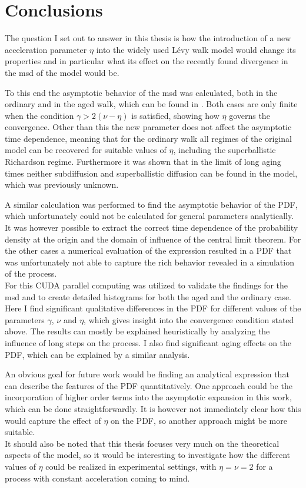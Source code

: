 \chapter{Conclusions}

The question I set out to answer in this thesis is how the introduction of a new acceleration parameter $\eta$ into the widely used L\'evy walk model would change its properties and in particular what its effect on the recently found divergence in the \gls{msd} of the model would be. 

To this end the asymptotic behavior of the \gls{msd} was calculated, both in the ordinary and in the aged walk, which can be found in \cite{bothe}. Both cases are only finite when the condition $\gamma > 2(\nu-\eta)$ is satisfied, showing how $\eta$ governs the convergence. Other than this the new parameter does not affect the asymptotic time dependence, meaning that for the ordinary walk all regimes of the original model can be recovered for suitable values of $\eta$, including the superballistic Richardson regime. 
{\color{blue}
Furthermore it was shown that in the limit of long aging times neither subdiffusion and superballistic diffusion can be found in the model, which was previously unknown.
}

A similar calculation was performed to find the asymptotic behavior of the \gls{PDF}, which unfortunately could not be calculated for general parameters analytically. It was however possible to extract the correct time dependence of the probability density at the origin and the domain of influence of the central limit theorem. For the other cases a numerical evaluation of the expression resulted in a \gls{PDF} that was unfortunately not able to capture the rich behavior revealed in a simulation of the process. \\
For this CUDA parallel computing was utilized to validate the findings for the \gls{msd} and to create detailed histograms for both the aged and the ordinary case. Here I find significant qualitative differences in the \gls{PDF} for different values of the parameters $\gamma$, $\nu$ and $\eta$, which gives insight into the convergence condition stated above. The results can mostly be explained heuristically by analyzing the influence of long steps on the process. I also find significant aging effects on the \gls{PDF}, which can be explained by a similar analysis.

An obvious goal for future work would be finding an analytical expression that can describe the features of the PDF quantitatively. One approach could be the incorporation of higher order terms into the asymptotic expansion in this work, which can be done straightforwardly. It is however not immediately clear how this would capture the effect of $\eta$ on the \gls{PDF}, so another approach might be more suitable.\\
It should also be noted that this thesis focuses very much on the theoretical aspects of the model, so it would be interesting to investigate how the different values of $\eta$ could be realized in experimental settings, with $\eta=\nu=2$ for a process with constant acceleration coming to mind.

